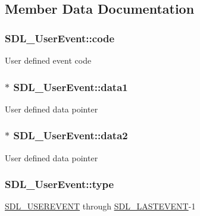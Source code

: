 \subsection{Member Data Documentation}
\hypertarget{structSDL__UserEvent_aef47976781ee82b527a353c5acfa0a34}{}
\subsubsection[{code}]{ S\+D\+L\+\_\+\+User\+Event\+::code}\label{structSDL__UserEvent_aef47976781ee82b527a353c5acfa0a34}
User defined event code \hypertarget{structSDL__UserEvent_ab2893a12be2f97195f16463a23107913}{}
\subsubsection[{data1}]{$\ast$ S\+D\+L\+\_\+\+User\+Event\+::data1}\label{structSDL__UserEvent_ab2893a12be2f97195f16463a23107913}
User defined data pointer \hypertarget{structSDL__UserEvent_aae4dbf65c34d654c9edf519eb061b7cf}{}
\subsubsection[{data2}]{$\ast$ S\+D\+L\+\_\+\+User\+Event\+::data2}\label{structSDL__UserEvent_aae4dbf65c34d654c9edf519eb061b7cf}
User defined data pointer \hypertarget{structSDL__UserEvent_ab7afa8b98dbd7b52bef41155e10f7340}{}
\subsubsection[{type}]{ S\+D\+L\+\_\+\+User\+Event\+::type}\label{structSDL__UserEvent_ab7afa8b98dbd7b52bef41155e10f7340}
\hyperlink{SDL__events_8h_a3b589e89be6b35c02e0dd34a55f3fccaa4364c23f54802309e83fdb9b1c07c719}{S\+D\+L\+\_\+\+U\+S\+E\+R\+E\+V\+E\+N\+T} through \hyperlink{SDL__events_8h_a3b589e89be6b35c02e0dd34a55f3fccaaffeac40a4ff366717c0ebc74118ea2ae}{S\+D\+L\+\_\+\+L\+A\+S\+T\+E\+V\+E\+N\+T}-\/1 \hypertarget{structSDL__UserEvent_abccefa10e0e0e3a0801bc6d836a08da7}{}

